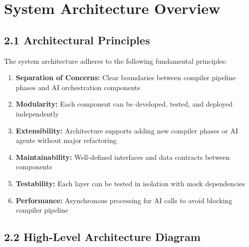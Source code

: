 \documentclass[a4paper,11pt]{article}
\begin{document}
\section{System Architecture Overview}

\subsection{2.1 Architectural Principles}

The system architecture adheres to the following fundamental principles:

\begin{enumerate}
    \item \textbf{Separation of Concerns:} Clear boundaries between compiler pipeline phases and AI orchestration components
    \item \textbf{Modularity:} Each component can be developed, tested, and deployed independently
    \item \textbf{Extensibility:} Architecture supports adding new compiler phases or AI agents without major refactoring
    \item \textbf{Maintainability:} Well-defined interfaces and data contracts between components
    \item \textbf{Testability:} Each layer can be tested in isolation with mock dependencies
    \item \textbf{Performance:} Asynchronous processing for AI calls to avoid blocking compiler pipeline
\end{enumerate}

\subsection{2.2 High-Level Architecture Diagram}
\end{document}
